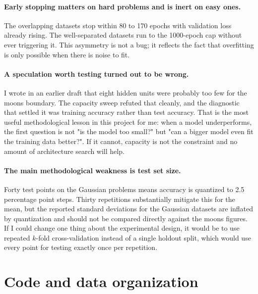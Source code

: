 \documentclass[11pt]{article}
\begin{document}
\paragraph{Early stopping matters on hard problems and is inert on easy ones.}
The overlapping datasets stop within 80 to 170 epochs with validation loss
already rising. The well-separated datasets run to the 1000-epoch cap without
ever triggering it. This asymmetry is not a bug; it reflects the fact that
overfitting is only possible when there is noise to fit.

\paragraph{A speculation worth testing turned out to be wrong.} I wrote in an
earlier draft that eight hidden units were probably too few for the moons
boundary. The capacity sweep refuted that cleanly, and the diagnostic that
settled it was training accuracy rather than test accuracy. That is the most
useful methodological lesson in this project for me: when a model underperforms,
the first question is not "is the model too small?" but "can a bigger model even
fit the training data better?". If it cannot, capacity is not the constraint and
no amount of architecture search will help.

\paragraph{The main methodological weakness is test set size.} Forty test
points on the Gaussian problems means accuracy is quantized to 2.5 percentage
point steps. Thirty repetitions substantially mitigate this for the mean, but
the reported standard deviations for the Gaussian datasets are inflated by
quantization and should not be compared directly against the moons figures. If I
could change one thing about the experimental design, it would be to use
repeated $k$-fold cross-validation instead of a single holdout split, which
would use every point for testing exactly once per repetition.

\section{Code and data organization}
\end{document}
